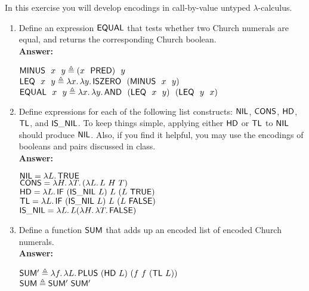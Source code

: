 \documentclass[11pt]{article}
\begin{document}
\begin{exercise}
In this exercise you will develop encodings in call-by-value untyped
$\lambda$-calculus.
\begin{enumerate}
\item Define an expression $\mathsf{EQUAL}$ that tests whether two Church numerals 
  are equal, and returns the corresponding Church boolean.\\

\noindent \textbf{Answer:}
\begin{center}
	$\nm{MINUS} \ \ x \ \ y \triangleq ( x \ \ \nm{PRED}) \ \ y$\\
	$\mathsf{LEQ} \ \ x \ \ y \triangleq \lambda x.\,\lambda y.\,\mathsf{ISZERO} \ \ (\mathsf{MINUS} \ \ x \ \ y)$
	$\mathsf{EQUAL} \ \ x \ \ y \triangleq \lambda x.\,\lambda y.\,\mathsf{AND} \ \ (\mathsf{LEQ} \ \ x \ \ y) \ \ (\mathsf{LEQ} \ \ y \ \ x)$
\end{center}
\item Define expressions for each of the
  following list constructs: $\mathsf{NIL}$, $\mathsf{CONS}$, $\mathsf{HD}$,
  $\mathsf{TL}$, and $\mathsf{IS\_NIL}$. To keep things simple, applying
  either $\mathsf{HD}$ or $\mathsf{TL}$ to $\mathsf{NIL}$ should produce
  $\mathsf{NIL}$. Also, if you find it helpful, you may use the encodings
  of booleans and pairs discussed in class.\\

\noindent \textbf{Answer:}
\begin{center}
	$\mathsf{NIL} = \lambda L.\,\mathsf{TRUE}$\\
	$\mathsf{CONS} = \lambda H.\,\lambda T.\,(\lambda L.\,L~H~T)$\\
	$\mathsf{HD} = \lambda L.\,\mathsf{IF}~(\mathsf{IS\_NIL}~L)~L~(L~\mathsf{TRUE})$\\
	$\mathsf{TL} = \lambda L.\,\mathsf{IF}~(\mathsf{IS\_NIL}~L)~L~(L~\mathsf{FALSE})$\\
	$\mathsf{IS\_NIL} = \lambda L.\,L(\lambda H.\,\lambda T.\,\mathsf{FALSE})$
\end{center}
\item Define a function $\mathsf{SUM}$ that adds up an encoded list of encoded Church
  numerals.\\

\noindent \textbf{Answer:}
\begin{center}
	$\mathsf{SUM'} \triangleq \lambda f.\,\lambda L.\,\mathsf{PLUS}~(\mathsf{HD}~L)~(f~f~(\mathsf{TL}~L))$\\
	$\mathsf{SUM} \triangleq \mathsf{SUM'}~\mathsf{SUM'}$
\end{center}
\end{enumerate}
\end{exercise}
\end{document}

